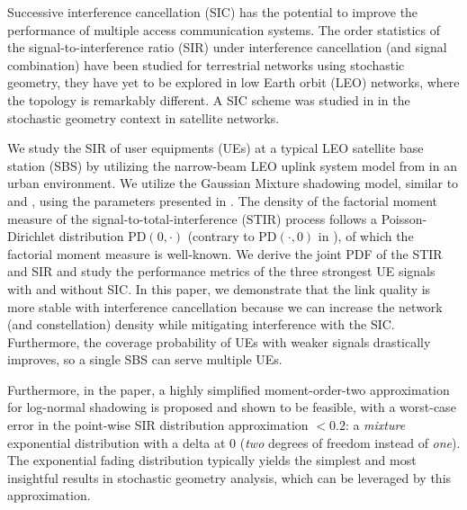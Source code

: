 \documentclass[lettersize,journal]{IEEEtran}
\begin{document}
Successive interference cancellation (SIC) has the potential to improve the performance of multiple access communication systems.
 The order statistics of the signal-to-interference ratio (SIR) under interference cancellation (and signal combination) have been studied for terrestrial networks \cite{7305791} using stochastic geometry, they have yet to be explored in low Earth orbit (LEO) networks, where the topology is remarkably different.
A SIC scheme was studied in \cite{11030605} in the stochastic geometry context in satellite networks. 


We study the SIR of user equipments (UEs) at a typical LEO satellite base station (SBS) by utilizing the narrow-beam LEO uplink system model from \cite{10909705} in an urban environment. We utilize the Gaussian Mixture shadowing model, similar to \cite{modelinguplink} and \cite{9684552}, using the parameters presented in \cite{TR38.811}. The density of the factorial moment measure of the signal-to-total-interference (STIR) process follows a Poisson-Dirichlet distribution PD$(0,\cdot)$ (contrary to PD$(\cdot,0)$ in \cite{7305791}), of which the factorial moment measure is well-known. We derive the joint PDF of the STIR and SIR and study the performance metrics of the three strongest UE signals with and without SIC. In this paper, we demonstrate that the link quality is more stable with interference cancellation because we can increase the network (and constellation) density while mitigating interference with the SIC. Furthermore, the coverage probability of UEs with weaker signals drastically improves, so a single SBS can serve multiple UEs.



Furthermore, in the paper, a highly simplified moment-order-two approximation for log-normal shadowing is proposed and shown to be feasible, with a worst-case error in the point-wise SIR distribution approximation $<0.2$: a \textit{mixture} exponential distribution with a delta at $0$ (\textit{two} degrees of freedom instead of \textit{one}). The exponential fading distribution typically yields the simplest and most insightful results in stochastic geometry analysis, which can be leveraged by this approximation.
\end{document}
